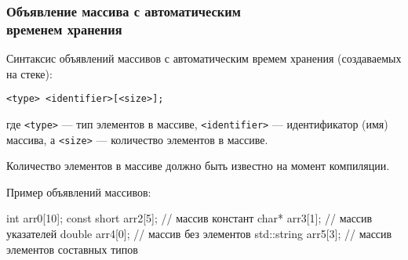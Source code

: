 \documentclass[compress, 8pt]{beamer}
\begin{document}
\begin{frame}[fragile]

    \frametitle{Объявление массива с автоматическим \\ временем хранения}

    Синтаксис объявлений массивов с автоматическим времем хранения
    (создаваемых на стеке):

    \begin{center}

        \verb|<type> <identifier>[<size>];|

    \end{center}

    где \verb|<type>| --- тип элементов в массиве, \verb|<identifier>| --- идентификатор
    (имя) массива, а \verb|<size>| --- количество элементов в массиве.

    \hfill \break
    Количество элементов в массиве должно быть известно на момент компиляции\footnotemark{}.


    \hfill \break
    Пример объявлений массивов:

    \begin{center}

        \begin{myinplacelisting}[minted language=cpp]
int arr0[10];
const short arr2[5];    // массив констант
char* arr3[1];          // массив указателей
double arr4[0];         // массив без элементов
std::string arr5[3];    // массив элементов составных типов
        \end{myinplacelisting}
    \end{center}

\end{frame}
\end{document}
